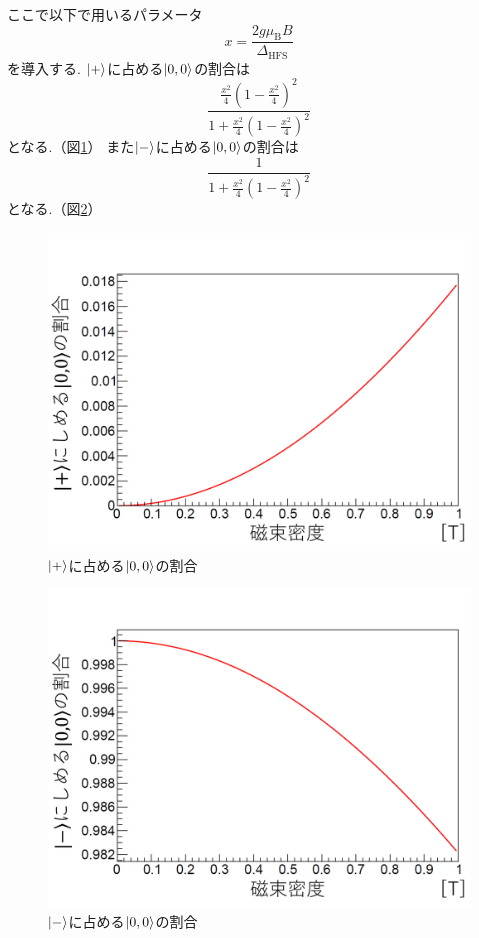 ここで以下で用いるパラメータ
\begin{equation}
	\nonumber
	x = \frac{2g\mu_{\mathrm{B}}B}{\Delta_{\mathrm{HFS}}}
\end{equation}
を導入する.
$\ket{+}$に占める$\ket{0,0}$の割合は
\begin{equation}
	\nonumber
\frac{ \frac{x^{2}}{4} \left(1-\frac{x^{2}}{4}\right)^{2}  }{  1+\frac{x^{2}}{4}\left( 1-\frac{x^{2}}{4} \right)^2   }
\end{equation}
となる.（図\ref{fig:plusstate}）
また$\ket{-}$に占める$\ket{0,0}$の割合は
\begin{equation}
	\nonumber
\frac{1}{1+\frac{x^{2}}{4}\left(1-\frac{x^{2}}{4}\right)^{2}}
\end{equation}
となる.（図\ref{fig:minusstate}）

\begin{figure}[H]
\centering
\includegraphics[keepaspectratio,scale=0.5]{fig/ybm/plusstate.pdf}
\caption{$\ket{+}$に占める$\ket{0,0}$の割合}
\label{fig:plusstate}
\end{figure}

\begin{figure}[H]
\centering
\includegraphics[keepaspectratio,scale=0.5]{fig/ybm/minusstate.pdf}
\caption{$\ket{-}$に占める$\ket{0,0}$の割合}
\label{fig:minusstate}
\end{figure}

